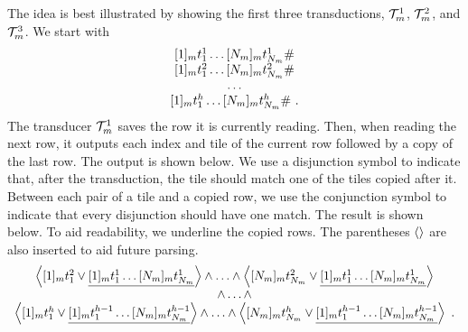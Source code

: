 The idea is best illustrated by showing the first three transductions,
$\mathcal{T}^1_m$, $\mathcal{T}^2_m$, and $\mathcal{T}^3_m$.
We start with
\[
    \begin{array}{c}
        \fullrow{1} \spacer \\
        \fullrow{2} \spacer \\
        \ldots \\
        \fullrow{\tileheight} \spacer \ .
    \end{array}
\]
The transducer $\mathcal{T}^1_m$ saves the row it is currently reading.
Then, when reading the next row, it outputs each index and tile of the current
row followed by a copy of the last row. The output is shown below. We use a
disjunction symbol to indicate that, after the transduction, the tile should
match one of the tiles copied after it. Between each pair of a tile and a
copied row, we use the conjunction symbol to indicate that every disjunction
should have one match. The result is shown below. To aid readability, we
underline the copied rows. The parentheses $\left\langle\right\rangle$ are also inserted to aid future parsing.
\[
    \begin{array}{c}
        \left\langle
            [1]_{m} t^2_1
                \lor
                \underline{[1]_{m} t^{1}_1 \ldots [N_{m}]_{m} t^{1}_{N_{m}}}
        \right\rangle
        \land
        \ldots
        \land
        \left\langle
            [N_{m}]_{m} t^2_{N_{m}}
                \lor
                \underline{[1]_{m} t^{1}_1 \ldots [N_{m}]_{m} t^{1}_{N_{m}}}
        \right\rangle \\
        \land \ldots \land \\
        \left\langle
            [1]_{m} t^h_1
                \lor
                \underline{[1]_{m} t^{h-1}_1 \ldots [N_{m}]_{m} t^{h-1}_{N_{m}}}
        \right\rangle
        \land
        \ldots
        \land
        \left\langle
            [N_{m}]_{m}
                t^h_{N_{m}}
                \lor
                \underline{[1]_{m} t^{h-1}_1 \ldots [N_{m}]_{m} t^{h-1}_{N_{m}}}
        \right\rangle \ .\\
    \end{array}
\]

